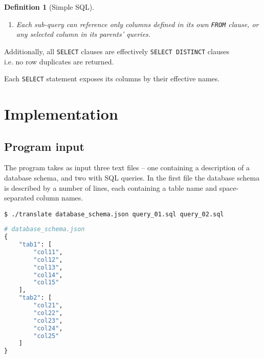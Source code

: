 \documentclass[magisterska,en]{pracamgr}
\newtheorem{defi}{Definition}[section]
\newcommand{\code}[1]{\texttt{#1}}
\begin{document}
\begin{defi}[Simple SQL]
\begin{enumerate}
\begin{grammar}
        <search condition> ::= <boolean value expression>
        
        <boolean value expression> ::=   <boolean term>
             \code{OR} <boolean term>
            \alt \code{(} <boolean value expression> \code{)}
        
        <boolean term> ::= <boolean factor>
             \code{AND} <boolean factor>
        
        <boolean factor> ::= [ \code{NOT} ] <boolean test>
        
        <boolean test> ::= \code{TRUE}
            \alt \code{FALSE}
             <binop> <column name or alias>
             \code{IN} <table name or a sub-query>
             \code{NOT IN} <table name or a sub-query>
            
        <binop> ::= \code{=} | \code{!=} | \code{\textless} | \code{\textless=} | \code{>} | \code{>=}
    \end{grammar}
    \item Each sub-query can reference only columns defined in its own \code{FROM} clause, or any selected column in its parents' queries.
\end{enumerate}
\end{defi}

Additionally, all \code{SELECT} clauses are effectively \code{SELECT DISTINCT} clauses\\i.e. no row duplicates are returned.

Each \code{SELECT} statement exposes its columns by their effective names.


\chapter{Implementation}
\section{Program input}
The program takes as input three text files -- one containing a description of a database schema, and two with SQL queries. In the first file the database schema is described by a number of lines, each containing a table name and space-separated column names.

\begin{lstlisting}
$ ./translate database_schema.json query_01.sql query_02.sql
\end{lstlisting}
\begin{lstlisting}[language=Python]
# database_schema.json
{
    "tab1": [
        "col11",
        "col12",
        "col13",
        "col14",
        "col15"
    ],
    "tab2": [
        "col21",
        "col22",
        "col23",
        "col24",
        "col25"
    ]
}
\end{lstlisting}
\end{document}
